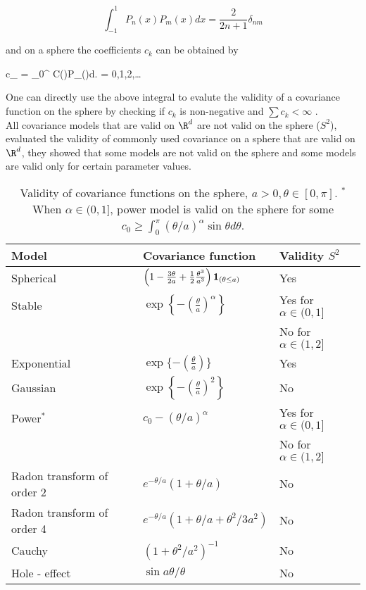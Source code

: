 \[
	\int_{-1}^{1} P_{n}(x)P_{m}(x)dx = \frac{2}{2n+1}\delta_{nm}
\]

and on a sphere the coefficients $c_k$ can be obtained by

\beq \label{covs2_coef}
c_{\nu} = \int_0^{\pi} C(\theta)P_{\nu}(\cos\theta)d\theta. \quad \nu = 0,1,2,\ldots
\eeq

One can directly use the above integral to evalute the validity of a covariance function on the sphere by checking if $c_k$ is non-negative and $\sum c_k < \infty$ .\\ 

All covariance models that are valid on $\R^d$ are not valid on the sphere ($S^2$), \cite{HuangZhangRobeson2011} evaluated the validity of commonly used covariance on a sphere that are valid on $\R^d$, they showed that some models are not valid on the sphere and some models are valid only for certain parameter values.  
 

\begin{table}[H]
	\label{valid_cov_models}
	\centering
	\begin{tabular}[htb]{lll} \hline \hline
		Model & Covariance function & Validity  $S^2$           \\   \hline Spherical  &
		$\left(1-\frac{3\theta}{2a} + \frac{1}{2}
		\frac{\theta^3}{a^3}\right){\bf 1}_{(\theta \le a)}$ & Yes   \\
		[2ex]
		Stable     & $\exp\left\{-\left(\frac{\theta}{a}\right)^\alpha\right\}$ & Yes for $\alpha \in (0,1]$  \\
		      &                     & No for $\alpha \in (1,2]$ \\ [2ex] \hspace{0.2in} Exponential &
		$\exp \{-\left(\frac{\theta}{a}\right) \}$ & Yes \\ [2ex]
		\hspace{0.2in} Gaussian & $\exp\left\{-\left(\frac{\theta}{a} \right)^2
		\right\}$  & No \\ [2ex]
		Power$^*$   & $c_0 - (\theta/a)^\alpha$ & Yes for  $\alpha \in (0,1] $  \\
		& & No for $\alpha \in (1,2]$ \\ [2ex]
		Radon transform of order 2         & $e^{-\theta/a}(1+\theta/a)$ &
		No        \\ [2ex] Radon transform of order 4         &
		$e^{-\theta/a} (1+\theta/a+\theta^2/3a^2)$  & No  \\ [2ex] Cauchy &
		$(1+\theta^2/a^2)^{-1}$ &  No      \\ [2ex] Hole - effect & $\sin
		a\theta / \theta$ & No    \\ \hline \hline
	\end{tabular}
	\caption{Validity of covariance functions on the sphere, $a >
		0,\theta \in [0,\pi]$. $^*$When $\alpha \in (0,1]$, power model is
			valid on the sphere  for some $c_0 \ge \int_0^\pi
			(\theta/a)^{\alpha} \sin \theta d \theta$.} \label{tab:t1}
				
	\end{table}
	
